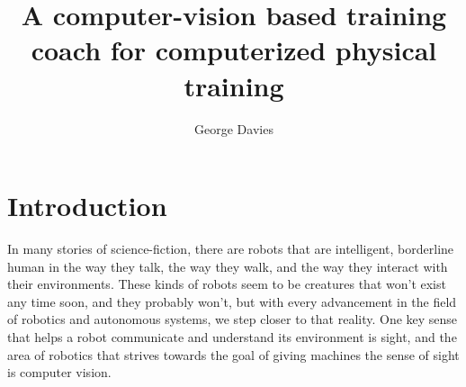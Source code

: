 \documentclass[runningheads]{llncs}
\begin{document}
%
\title{A computer-vision based training coach for computerized physical training}
%
%
\author{George Davies}
%
%
%
\maketitle              %
%



\section{Introduction} %
    In many stories of science-fiction, there are robots that are intelligent, borderline human in the way they talk, the way they walk, and the way they interact with their environments. These kinds of robots seem to be creatures that won't exist any time soon, and they probably won't, but with every advancement in the field of robotics and autonomous systems, we step closer to that reality. One key sense that helps a robot communicate and understand its environment is sight, and the area of robotics that strives towards the goal of giving machines the sense of sight is computer vision. 
\end{document}
